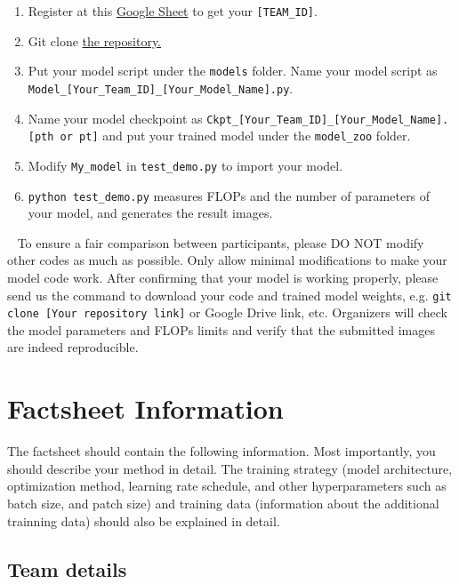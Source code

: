 \documentclass[10pt,twocolumn,letterpaper]{article}
\begin{document}
\begin{enumerate}
    \item Register at this \href{https://docs.google.com/spreadsheets/d/11U3h07nikI69hwjAORpajRZEMAw7sfWMjveoLgcinc0/edit?usp=sharing}{Google Sheet} to get your \texttt{[TEAM\_ID]}.
    \item Git clone \href{https://github.com/Eve-ctr/RawFusion}{the repository.}
    \item Put your model script under the \texttt{models} folder. Name your model script as \texttt{Model\_[Your\_Team\_ID]\_[Your\_Model\_Name].py}.
    \item Name your model checkpoint as \texttt{Ckpt\_[Your\_Team\_ID]\_[Your\_Model\_Name].[pth or pt]} and put your trained model under the \texttt{model\_zoo} folder. 
    \item Modify \texttt{My\_model} in \texttt{test\_demo.py} to import your model.
    \item \texttt{python test\_demo.py} measures FLOPs and the number of parameters of your model, and generates the result images.
\end{enumerate}
\ \newline
To ensure a fair comparison between participants, please DO NOT modify other codes as much as possible. Only allow minimal modifications to make your model code work. 
After confirming that your model is working properly, please send us the command to download your code and trained model weights, e.g. \texttt{git clone [Your repository link]} or Google Drive link, etc.
Organizers will check the model parameters and FLOPs limits and verify that the submitted images are indeed reproducible.

\section{Factsheet Information}

The factsheet should contain the following information. Most importantly, you should describe your method in detail. The training strategy (model architecture, optimization method, learning rate schedule, and other hyperparameters such as batch size, and patch size) and training data (information about the additional trainning data) should also be explained in detail.

\subsection{Team details}
\end{document}
